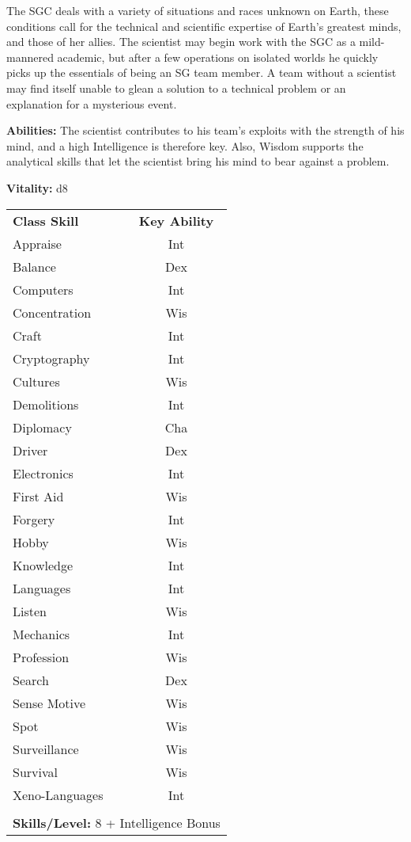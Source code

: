 \begin{multicols}{2}

The SGC deals with a variety of situations and races unknown on Earth, these conditions call for the technical and scientific expertise of Earth's greatest minds, and those of her allies. The scientist may begin work with the SGC as a mild-mannered academic, but after a few operations on isolated worlds he quickly picks up the essentials of being an SG team member. A team without a scientist may find itself unable to glean a solution to a technical problem or an explanation for a mysterious event.


\textbf{Abilities:} The scientist contributes to his team's exploits with the strength of his mind, and a high Intelligence is therefore key. Also, Wisdom supports the analytical skills that let the scientist bring his mind to bear against a problem.


\textbf{Vitality:} d8

\end{multicols}

\begin{table}[htb]
\raggedright
\begin{tabular}{l c}
\textbf{Class Skill} & \textbf{Key Ability}\\

Appraise & Int\\
Balance & Dex\\
Computers & Int\\
Concentration & Wis\\
Craft & Int\\
Cryptography & Int\\
Cultures & Wis\\
Demolitions & Int\\
Diplomacy & Cha\\
Driver & Dex\\
Electronics & Int\\
First Aid & Wis\\
Forgery & Int\\
Hobby & Wis\\
Knowledge & Int\\
Languages & Int\\
Listen & Wis\\
Mechanics & Int\\
Profession & Wis\\
Search & Dex\\
Sense Motive & Wis\\
Spot & Wis\\
Surveillance & Wis\\
Survival & Wis\\
Xeno-Languages & Int\\

\multicolumn{2}{l}{\cellcolor{white}}\\
\multicolumn{2}{l}{\cellcolor{white}\textbf{Skills/Level:} 8 + Intelligence Bonus}\\
\end{tabular}
\end{table}

